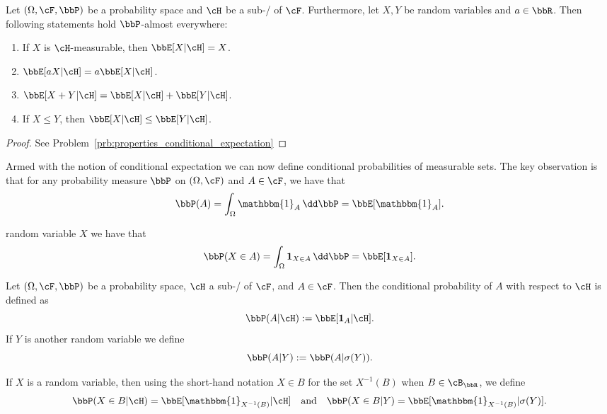\begin{lemma}\label{lem:properties_conditional_expectation}
Let $(\Omega, \cF, \bbP)$ be a probability space and $\cH$ be a sub-\sigalg/ of $\cF$. Furthermore, let $X, Y$ be random variables and $a \in \bbR$. Then following statements hold $\bbP$-almost everywhere:
\begin{enumerate}[label={(\alph*)}]
\item If $X$ is $\cH$-measurable, then $\bbE[X | \cH] = X$.
\item $\bbE[a X | \cH] = a \bbE[X | \cH]$.
\item $\bbE[X + Y | \cH] = \bbE[X | \cH] + \bbE[Y | \cH]$.
\item If $X \le Y$, then $\bbE[X | \cH] \le \bbE[Y | \cH]$.
\end{enumerate}
\end{lemma}

\begin{proof}
See Problem~\ref{prb:properties_conditional_expectation}
\end{proof}


Armed with the notion of conditional expectation we can now define conditional probabilities of measurable sets. The key observation is that for any probability measure $\bbP$ on $(\Omega, \cF)$ and $A \in \cF$, we have that
\[
	\bbP(A) = \int_\Omega \mathbbm{1}_{A} \, \dd \bbP = \bbE[\mathbbm{1}_A].
\]

random variable $X$ we have that
\[
	\bbP(X \in A) = \int_\Omega \mathbf{1}_{X \in A} \, \dd \bbP = \bbE[\mathbf{1}_{X \in A}].
\]

\begin{definition}
Let $(\Omega, \cF, \bbP)$ be a probability space, $\cH$ a sub-\sigalg/ of $\cF$, and $A \in \cF$. Then the conditional probability of $A$ with respect to $\cH$ is defined as
\[
	\bbP(A | \cH) := \bbE[\mathbf{1}_{A} | \cH].
\]
If $Y$ is another random variable we define
\[
	\bbP(A | Y) := \bbP( A | \sigma(Y)).
\]
\end{definition}

If $X$ is a random variable, then using the short-hand notation $X \in B$ for the set $X^{-1}(B)$ when $B \in \cB_{\bbR}$, we define
\begin{equation}
	\bbP(X \in B | \cH) = \bbE[\mathbbm{1}_{X^{-1}(B)} | \cH] \quad \text{and} \quad
	\bbP(X \in B | Y) = \bbE[\mathbbm{1}_{X^{-1}(B)} | \sigma(Y)].
\end{equation}

